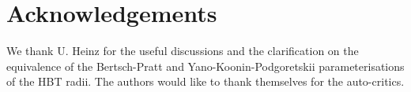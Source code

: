\documentclass[a4paper,11pt]{scrartcl} %
\begin{document}
\newenvironment{acknowledgement}{\relax}{\relax}
\begin{acknowledgement}
\section*{Acknowledgements}
We thank U. Heinz for the useful discussions and the clarification on the equivalence of the Bertsch-Pratt and Yano-Koonin-Podgoretskii parameterisations of the HBT radii.
The authors would like to thank themselves for the auto-critics.

\end{acknowledgement}



 	

\end{document}
